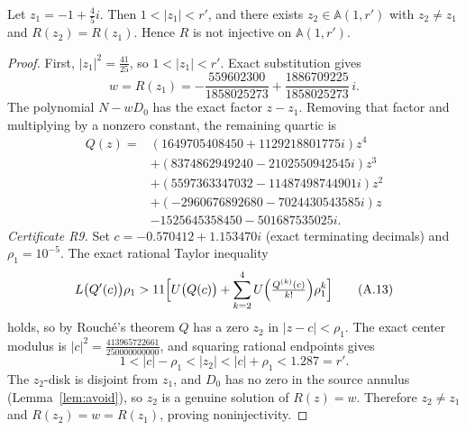 \begin{lemma}\label{lem:collision}
Let \(z_1=-1+\tfrac45 i\). Then \(1<|z_1|<r'\), and there exists \(z_2\in\mathbb A(1,r')\) with \(z_2\ne z_1\) and \(R(z_2)=R(z_1)\). Hence \(R\) is not injective on \(\mathbb A(1,r')\).
\end{lemma}

\begin{proof}
First, \(|z_1|^2=\tfrac{41}{25}\), so \(1<|z_1|<r'\). Exact substitution gives
\[ w=R(z_1)=-\frac{559602300}{1858025273}+\frac{1886709225}{1858025273}\,i. \tag{A.11} \]
The polynomial \(N-wD_0\) has the exact factor \(z-z_1\). Removing that factor and multiplying by a nonzero constant, the remaining quartic is
\[\begin{aligned} Q(z)={}&(1649705408450+1129218801775i)z^{4}\\ &+(8374862949240-2102550942545i)z^{3}\\ &+(5597363347032-11487498744901i)z^{2}\\ &+(-2960676892680-7024430543585i)z\\ &-1525645358450-501687535025i. \end{aligned}\tag{A.12}\]
\emph{Certificate R9.} Set \(c=-0.570412+1.153470i\) (exact terminating decimals) and \(\rho_1=10^{-5}\). The exact rational Taylor inequality
\[ L\bigl(Q'(c)\bigr)\rho_1>11\Bigl[U\bigl(Q(c)\bigr)+\sum_{k=2}^{4}U\Bigl(\tfrac{Q^{(k)}(c)}{k!}\Bigr)\rho_1^{k}\Bigr] \tag{A.13} \]
holds, so by Rouch\'e's theorem \(Q\) has a zero \(z_2\) in \(|z-c|<\rho_1\).
The exact center modulus is \(|c|^2=\tfrac{413965722661}{250000000000}\), and squaring rational endpoints gives
\[ 1<|c|-\rho_1<|z_2|<|c|+\rho_1<1.287=r'. \]
The \(z_2\)-disk is disjoint from \(z_1\), and \(D_0\) has no zero in the source annulus (Lemma~\ref{lem:avoid}), so \(z_2\) is a genuine solution of \(R(z)=w\). Therefore \(z_2\ne z_1\) and \(R(z_2)=w=R(z_1)\), proving noninjectivity.
\end{proof}